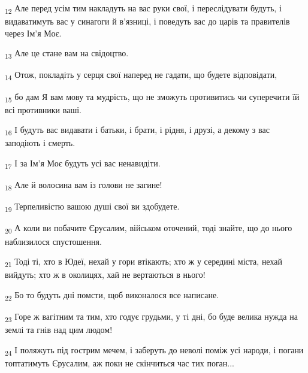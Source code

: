 \begin{tcolorbox}
\textsubscript{12} Але перед усім тим накладуть на вас руки свої, і переслідувати будуть, і видаватимуть вас у синагоги й в'язниці, і поведуть вас до царів та правителів через Ім'я Моє.
\end{tcolorbox}
\begin{tcolorbox}
\textsubscript{13} Але це стане вам на свідоцтво.
\end{tcolorbox}
\begin{tcolorbox}
\textsubscript{14} Отож, покладіть у серця свої наперед не гадати, що будете відповідати,
\end{tcolorbox}
\begin{tcolorbox}
\textsubscript{15} бо дам Я вам мову та мудрість, що не зможуть противитись чи суперечити їй всі противники ваші.
\end{tcolorbox}
\begin{tcolorbox}
\textsubscript{16} І будуть вас видавати і батьки, і брати, і рідня, і друзі, а декому з вас заподіють і смерть.
\end{tcolorbox}
\begin{tcolorbox}
\textsubscript{17} І за Ім'я Моє будуть усі вас ненавидіти.
\end{tcolorbox}
\begin{tcolorbox}
\textsubscript{18} Але й волосина вам із голови не загине!
\end{tcolorbox}
\begin{tcolorbox}
\textsubscript{19} Терпеливістю вашою душі свої ви здобудете.
\end{tcolorbox}
\begin{tcolorbox}
\textsubscript{20} А коли ви побачите Єрусалим, військом оточений, тоді знайте, що до нього наблизилося спустошення.
\end{tcolorbox}
\begin{tcolorbox}
\textsubscript{21} Тоді ті, хто в Юдеї, нехай у гори втікають; хто ж у середині міста, нехай вийдуть; хто ж в околицях, хай не вертаються в нього!
\end{tcolorbox}
\begin{tcolorbox}
\textsubscript{22} Бо то будуть дні помсти, щоб виконалося все написане.
\end{tcolorbox}
\begin{tcolorbox}
\textsubscript{23} Горе ж вагітним та тим, хто годує грудьми, у ті дні, бо буде велика нужда на землі та гнів над цим людом!
\end{tcolorbox}
\begin{tcolorbox}
\textsubscript{24} І поляжуть під гострим мечем, і заберуть до неволі поміж усі народи, і погани топтатимуть Єрусалим, аж поки не скінчиться час тих поган...
\end{tcolorbox}
